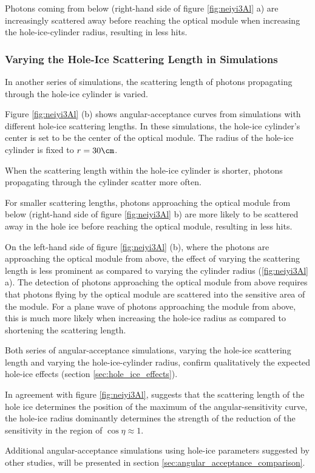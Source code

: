 Photons coming from below (right-hand side of figure \ref{fig:neiyi3Al} a) are increasingly scattered away before reaching the optical module when increasing the hole-ice-cylinder radius, resulting in less hits.


\subsubsection{Varying the Hole-Ice Scattering Length in Simulations}
\label{sec:vary_sca}

In another series of simulations, the scattering length of photons propagating through the hole-ice cylinder is varied.


Figure \ref{fig:neiyi3Al} (b) shows angular-acceptance curves from simulations with different hole-ice scattering lengths. In these simulations, the hole-ice cylinder's center is set to be the center of the optical module. The radius of the hole-ice cylinder is fixed to $r = 30\cm$.

When the scattering length within the hole-ice cylinder is shorter, photons propagating through the cylinder scatter more often.

For smaller scattering lengths, photons approaching the optical module from below (right-hand side of figure \ref{fig:neiyi3Al} b) are more likely to be scattered away in the hole ice before reaching the optical module, resulting in less hits.

On the left-hand side of figure \ref{fig:neiyi3Al} (b), where the photons are approaching the optical module from above, the effect of varying the scattering length is less prominent as compared to varying the cylinder radius (\ref{fig:neiyi3Al} a). The detection of photons approaching the optical module from above requires that photons flying by the optical module are scattered into the sensitive area of the module. For a plane wave of photons approaching the module from above, this is much more likely when increasing the hole-ice radius as compared to shortening the scattering length.

Both series of angular-acceptance simulations, varying the hole-ice scattering length and varying the hole-ice-cylinder radius, confirm qualitatively the expected hole-ice effects (section \ref{sec:hole_ice_effects}).

In agreement with figure \ref{fig:neiyi3Al}, \rongen suggests
that the scattering length of the hole ice determines the position of the maximum of the angular-sensitivity curve, the hole-ice radius dominantly determines the strength of the reduction of the sensitivity in the region of $\cos \eta \approx 1$. \cite{pocam}

Additional angular-acceptance simulations using hole-ice parameters suggested by other studies, will be presented in section \ref{sec:angular_acceptance_comparison}.
